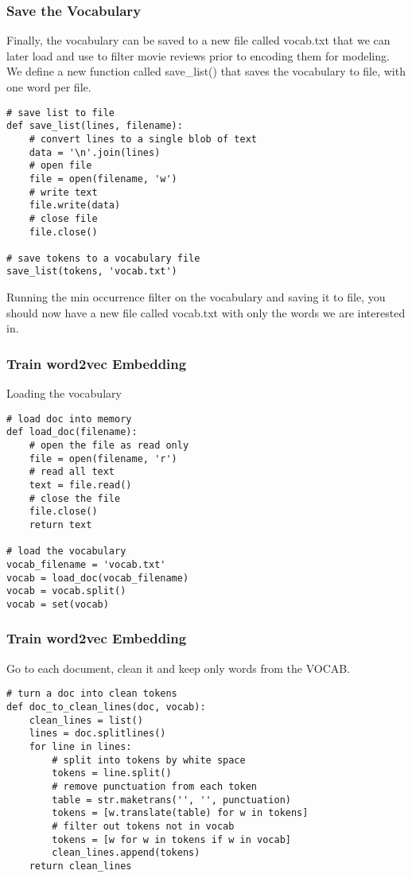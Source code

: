 \begin{frame}[fragile]\frametitle{Save the Vocabulary}
Finally, the vocabulary can be saved to a new file called vocab.txt that we can later load and use to filter movie reviews prior to encoding them for modeling. We define a new function called save\_list() that saves the vocabulary to file, with one word per file.

\begin{lstlisting}
# save list to file
def save_list(lines, filename):
	# convert lines to a single blob of text
	data = '\n'.join(lines)
	# open file
	file = open(filename, 'w')
	# write text
	file.write(data)
	# close file
	file.close()

# save tokens to a vocabulary file
save_list(tokens, 'vocab.txt')
\end{lstlisting}
Running the min occurrence filter on the vocabulary and saving it to file, you should now have a new file called vocab.txt with only the words we are interested in.
\end{frame}

\begin{frame}[fragile]\frametitle{Train word2vec Embedding}
Loading the vocabulary

\begin{lstlisting}
# load doc into memory
def load_doc(filename):
	# open the file as read only
	file = open(filename, 'r')
	# read all text
	text = file.read()
	# close the file
	file.close()
	return text

# load the vocabulary
vocab_filename = 'vocab.txt'
vocab = load_doc(vocab_filename)
vocab = vocab.split()
vocab = set(vocab)
\end{lstlisting}

\end{frame}

\begin{frame}[fragile]\frametitle{Train word2vec Embedding}
Go to each document, clean it and keep only words from the VOCAB.

\begin{lstlisting}
# turn a doc into clean tokens
def doc_to_clean_lines(doc, vocab):
	clean_lines = list()
	lines = doc.splitlines()
	for line in lines:
		# split into tokens by white space
		tokens = line.split()
		# remove punctuation from each token
		table = str.maketrans('', '', punctuation)
		tokens = [w.translate(table) for w in tokens]
		# filter out tokens not in vocab
		tokens = [w for w in tokens if w in vocab]
		clean_lines.append(tokens)
	return clean_lines
\end{lstlisting}

\end{frame}

